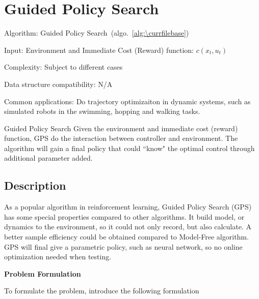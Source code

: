 \documentclass[catalog.tex]{subfiles}
\begin{document}
%
%

\def\pbname{Guided Policy Search} %

\section{\pbname} 

\begin{overview}
\item [Algorithm:] Guided Policy Search~(algo.~\ref{alg:\currfilebase}) 
\item [Input:] Environment and Immediate Cost (Reward) function: $c(x_t, u_t)$
\item [Complexity:] Subject to different cases 
\item [Data structure compatibility:] N/A
\item [Common applications:] Do trajectory optimizaiton in dynamic systems, such as simulated robots in the swimming, hopping and walking tasks\cite{paper1}.
\end{overview}


\begin{problem}{\pbname}
Given the environment and immediate cost (reward) function, GPS do the interaction between controller and environment. The algorithm will gain a final policy that could ``know" the optimal control through additional parameter added.
\end{problem}


\subsection*{Description}
As a popular algorithm in reinforcement learning, Guided Policy Search (GPS) has some special properties compared to other algorithms. It build model, or dynamics to the environment, so it could not only record, but also calculate. A better sample efficiency could be obtained compared to Model-Free algorithm. GPS will final give a parametric policy, such as neural network, so no online optimization needed when testing. 


\textbf{Problem Formulation}

To formulate the problem, introduce the following formulation\cite{blog}
\end{document}
